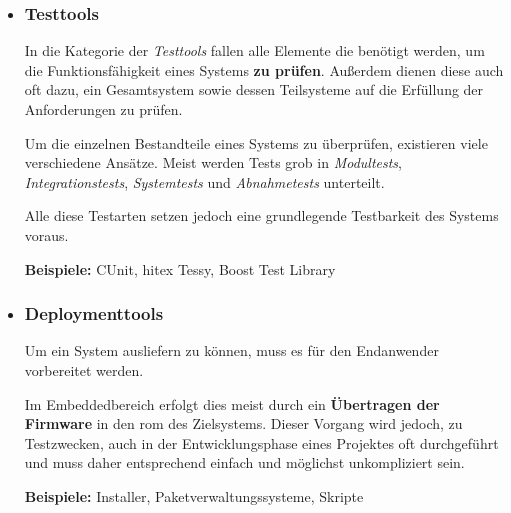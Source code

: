 \begin{itemize}
  Der Entwickler ist durch das Setzen von Breakpoints\footnote{Willkürliche,
  vom Entwickler vor dem Start der Software zu setzende, "`Haltepunkte"' im
  Programmablauf.} mittels des \emph{Debuggers} in der Lage, das System bis zu
  einem festgelegten Systemzustand laufen zu lassen. Anschließend kann
  er den weiteren Programmablauf schrittweise ausführen (single-stepping)
  oder mitunter auch geringfügige Änderung am Speicher des Systems vornehmen.
  Außerdem sind die meisten \emph{Debugger} in der Lage, das Zielsystem
  zurückzusetzen und so einen definierten Ausgangszustand herzustellen.
  
  Debugger sind in integrierten Systemen oft auf eine hohe Hardwareunterstützung
  angewiesen. In \autoref{subs:hwdebugger} wird dies näher beschrieben.
  
  \textbf{Beispiele:} GDB, IDB (Intel Debugger), Valgrind
  \item \subsubsection*{Testtools} In die Kategorie der \emph{Testtools} fallen
  alle Elemente die benötigt werden, um die Funktionsfähigkeit eines Systems
  \textbf{zu prüfen}. Außerdem dienen diese auch oft dazu, ein Gesamtsystem
  sowie dessen Teilsysteme auf die Erfüllung der Anforderungen zu prüfen.
  
  Um die einzelnen Bestandteile eines Systems zu überprüfen, existieren viele
  verschiedene Ansätze. Meist werden Tests grob in \emph{Modultests},
  \emph{Integrationstests}, \emph{Systemtests} und \emph{Abnahmetests}
  unterteilt.
  
  Alle diese Testarten setzen jedoch eine grundlegende Testbarkeit des Systems
  voraus.
  
  \textbf{Beispiele:} CUnit, hitex Tessy, Boost Test Library  
  \item \subsubsection*{Deploymenttools}\label{subs:deployment} Um ein System
  ausliefern zu können, muss es für den Endanwender vorbereitet werden.
  
  Im Embeddedbereich erfolgt dies meist durch ein \textbf{Übertragen der
  Firmware} in den \gls{rom} des Zielsystems. Dieser Vorgang wird jedoch, zu
  Testzwecken, auch in der Entwicklungsphase eines Projektes oft durchgeführt
  und muss daher entsprechend einfach und möglichst unkompliziert sein.
  
  \textbf{Beispiele:} Installer, Paketverwaltungssysteme, Skripte
\end{itemize}


